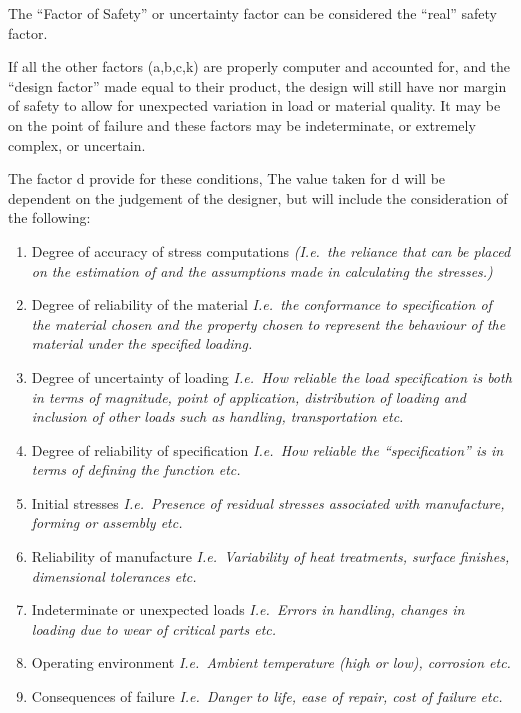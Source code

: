The ``Factor of Safety'' or uncertainty factor can be considered the ``real'' safety factor. 

If all the other factors (a,b,c,k) are properly computer and accounted for, and the ``design factor'' made equal to their product, the design will still have nor margin of safety to allow for unexpected variation in load or material quality. It may be on the point of failure and these factors may be indeterminate, or extremely complex, or uncertain.

The factor d provide for these conditions, The value taken for d will be dependent on the judgement of the designer, but will include the consideration of the following:

\begin{enumerate}
  \item Degree of accuracy of stress computations \emph{(I.e.\ the reliance that can be placed on the estimation of and the assumptions made in calculating the stresses.)}
  \item Degree of reliability of the material \emph{I.e.\ the conformance to specification of the material chosen and the property chosen to represent the behaviour of the material under the specified loading.}
  \item Degree of uncertainty of loading \emph{I.e.\ How reliable the load specification is both in terms of magnitude, point of application, distribution of loading and inclusion of other loads such as handling, transportation etc.}
  \item Degree of reliability of specification \emph{I.e.\ How reliable the ``specification'' is in terms of defining the function etc.}
  \item Initial stresses \emph{I.e.\ Presence of residual stresses associated with manufacture, forming or assembly etc.}
  \item Reliability of manufacture \emph{I.e.\ Variability of heat treatments, surface finishes, dimensional tolerances etc.}
  \item Indeterminate or unexpected loads \emph{I.e.\ Errors in handling, changes in loading due to wear of critical parts etc.}
  \item Operating environment \emph{I.e.\ Ambient temperature (high or low), corrosion etc.}
  \item Consequences of failure \emph{I.e.\ Danger to life, ease of repair, cost of failure etc.}
\end{enumerate}

